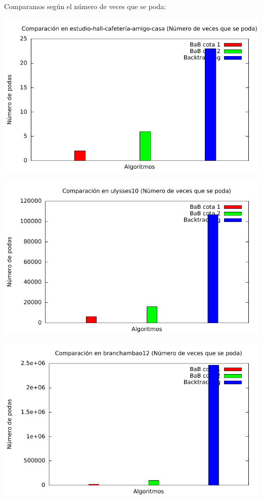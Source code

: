 Comparamos según el número de veces que se poda:

\includegraphics[width=15cm]{img/barras_e-h-c-a-c5_poda}

\includegraphics[width=15cm]{img/barras_ulysses10_poda}

\includegraphics[width=15cm]{img/barras_branchambao12_poda}

